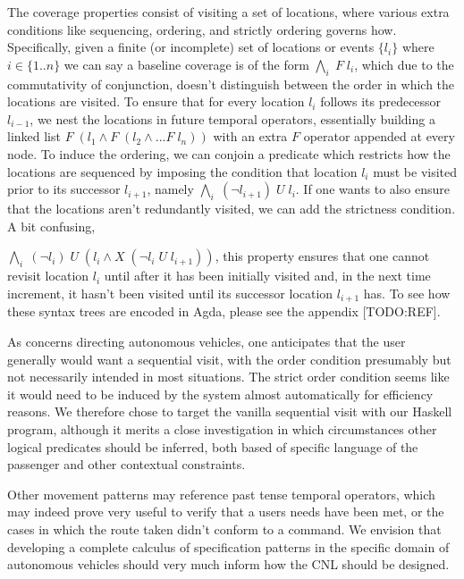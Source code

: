 \documentclass[a4paper, 11pt]{article}
\begin{document}
The coverage properties consist of visiting a set of locations, where various
extra conditions like sequencing, ordering, and strictly ordering governs how.
Specifically, given a finite (or incomplete) set of locations or events $\{l_i\}$
where $i \in \{1..n\}$ we can say a baseline coverage is of the form 
$\underset{i}{\bigwedge}\; F\; l_i$, which due to the commutativity of conjunction,
doesn't distinguish between the order in which the locations are visited. To
ensure that for every location $l_i$ follows its predecessor $l_{i-1}$, we
nest the locations in future temporal operators, essentially building a linked
list $F\; (l_1 \wedge F\; (l_{2} \wedge ... F\; l_{n}))$ with an extra $F$
operator appended at every node. To induce the ordering, we can conjoin a predicate
which restricts how the locations are sequenced by imposing the condition that location
$l_{i}$ must be visited prior to its successor $l_{i+1}$, namely
$\underset{i}{\bigwedge}\; (\neg l_{i+1})\; U\; l_i$.
If one wants to also ensure that the locations aren't redundantly visited, we
can add the strictness condition. A bit confusing, 

$\underset{i}{\bigwedge}\; (\neg l_{i})\; U\; (l_i \wedge X\; (\neg l_i\; U\;
l_{i+1}))$, this property ensures that one cannot revisit location $l_i$ until
after it has been initially visited and, in the next time increment, it hasn't
been visited until its successor location $l_{i+1}$ has. To see how these syntax
trees are encoded in Agda, please see the appendix [TODO:REF]. 

As concerns directing autonomous vehicles, one anticipates that the user
generally would want a sequential visit, with the order condition presumably but
not necessarily intended in most situations. The strict order condition seems
like it would need to be induced by the system almost automatically for
efficiency reasons. We therefore chose to target the vanilla sequential visit
with our Haskell program, although it merits a close investigation in which
circumstances other logical predicates should be inferred, both based of
specific language of the passenger and other contextual constraints.

Other movement patterns may reference past tense temporal operators, which may
indeed prove very useful to verify that a users needs have been met, or the
cases in which the route taken didn't conform to a command. We envision that
developing a complete calculus of specification patterns in the specific domain
of autonomous vehicles should very much inform how the CNL should be designed.
\end{document}
